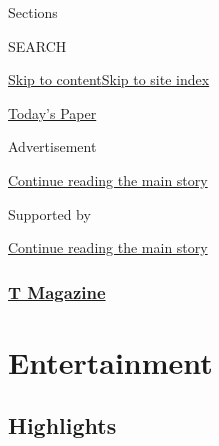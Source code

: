 Sections

SEARCH

\protect\hyperlink{site-content}{Skip to
content}\protect\hyperlink{site-index}{Skip to site index}

\href{https://myaccount.nytimes.com/auth/login?response_type=cookie\&client_id=vi}{}

\href{https://www.nytimes.com/section/todayspaper}{Today's Paper}

Advertisement

\protect\hyperlink{after-top}{Continue reading the main story}

Supported by

\protect\hyperlink{after-sponsor}{Continue reading the main story}

\hypertarget{t-magazine}{%
\subsubsection{\texorpdfstring{\href{/section/t-magazine}{T
Magazine}}{T Magazine}}\label{t-magazine}}

\hypertarget{entertainment}{%
\section{Entertainment}\label{entertainment}}

\hypertarget{highlights}{%
\subsection{Highlights}\label{highlights}}

